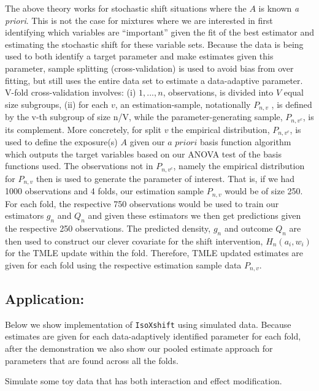\documentclass[
]{article}
\begin{document}
The above theory works for stochastic shift situations where the \(A\)
is known \textit{a priori}. This is not the case for mixtures where we
are interested in first identifying which variables are ``important''
given the fit of the best estimator and estimating the stochastic shift
for these variable sets. Because the data is being used to both identify
a target parameter and make estimates given this parameter, sample
splitting (cross-validation) is used to avoid bias from over fitting,
but still uses the entire data set to estimate a data-adaptive
parameter. V-fold cross-validation involves: (i) \({1,..., n}\),
observations, is divided into \(V\) equal size subgroups, (ii) for each
\(v\), an estimation-sample, notationally \(P_{n,v}\) , is defined by
the v-th subgroup of size n/V, while the parameter-generating sample,
\(P_{n,v^c}\), is its complement. More concretely, for split \(v\) the
empirical distribution, \(P_{n,v^c}\), is used to define the exposure(s)
\(A\) given our \(\textit{a priori}\) basis function algorithm which
outputs the target variables based on our ANOVA test of the basis
functions used. The observations not in \(P_{n,v^c}\), namely the
empirical distribution for \(P_{n,v}\) then is used to generate the
parameter of interest. That is, if we had 1000 observations and 4 folds,
our estimation sample \(P_{n,v}\) would be of size 250. For each fold,
the respective 750 observations would be used to train our estimators
\(g_n\) and \(Q_n\) and given these estimators we then get predictions
given the respective 250 observations. The predicted density, \(g_n\)
and outcome \(Q_n\) are then used to construct our clever covariate for
the shift intervention, \(H_n(a_i, w_i)\) for the TMLE update within the
fold. Therefore, TMLE updated estimates are given for each fold using
the respective estimation sample data \(P_{n,v}\).

\hypertarget{application}{%
\subsection{Application:}\label{application}}

Below we show implementation of \texttt{IsoXshift} using simulated data.
Because estimates are given for each data-adaptively identified
parameter for each fold, after the demonstration we also show our pooled
estimate approach for parameters that are found across all the folds.

Simulate some toy data that has both interaction and effect
modification.
\end{document}
